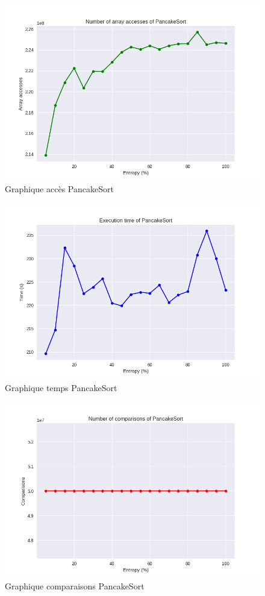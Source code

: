 \documentclass[10pt,a4paper]{article}
\begin{document}
            \begin{figure}
                \centering
                \includegraphics[width=1\textwidth]{graphique/PancakeSort/GraphAccessesPancakeSort.png}
                \caption{Graphique accès PancakeSort}
                \label{fig:mesh1}
            \end{figure}
            \begin{figure}
                \centering
                \includegraphics[width=1\textwidth]{graphique/PancakeSort/GraphTimePancakeSort.png}
                \caption{Graphique temps PancakeSort}
                \label{fig:mesh1}
            \end{figure}
            \begin{figure}
                \centering
                \includegraphics[width=1\textwidth]{graphique/PancakeSort/GraphComparisonsPancakeSort.png}
                \caption{Graphique comparaisons PancakeSort}
                \label{fig:mesh1}
            \end{figure}
\end{document}
